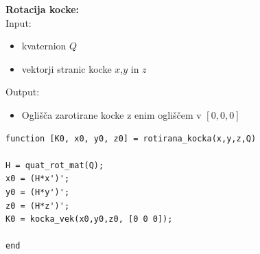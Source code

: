 \documentclass[12pt,a4paper,twoside]{article}
\theoremstyle{definition} %
\theoremstyle{plain} %
\numberwithin{equation}{section}  %
\begin{document}
\vspace{0.5cm}
\textbf{Rotacija kocke:}\\
Input:
\begin{itemize}
\item kvaternion $Q$
\item vektorji stranic kocke $x$,$y$ in $z$
\end{itemize}
Output:
\begin{itemize}
\item Oglišča zarotirane kocke z enim ogliščem v $[0,0,0]$
\end{itemize}

\begin{lstlisting}[caption = {rotirana\_kocka}]
function [K0, x0, y0, z0] = rotirana_kocka(x,y,z,Q)

H = quat_rot_mat(Q);
x0 = (H*x')';
y0 = (H*y')'; 
z0 = (H*z')';
K0 = kocka_vek(x0,y0,z0, [0 0 0]);

end
\end{lstlisting}
\end{document}
